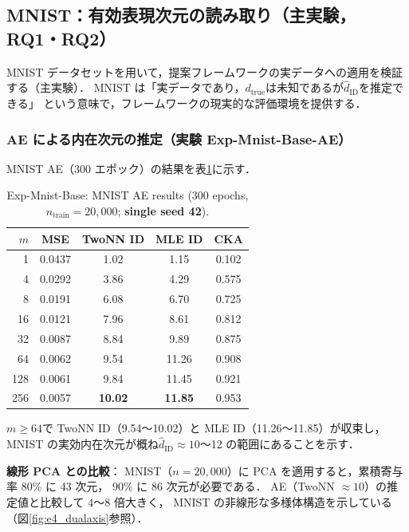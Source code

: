 \documentclass[11pt,a4paper]{jsarticle}
\newcommand{\dtrue}{d_{\mathrm{true}}}
\begin{document}
\subsection{MNIST：有効表現次元の読み取り（主実験，RQ1・RQ2）}\label{sec:exp_mnist}

MNIST データセットを用いて，提案フレームワークの実データへの適用を検証する（主実験）．
MNIST は「実データであり，$\dtrue$は未知であるが$\hat{d}_\mathrm{ID}$を推定できる」
という意味で，フレームワークの現実的な評価環境を提供する．

\subsubsection{AE による内在次元の推定（実験 Exp-Mnist-Base-AE）}

MNIST AE（300 エポック）の結果を表\ref{tab:e4_ae}に示す．

\begin{table}[H]
\centering
\caption{Exp-Mnist-Base: MNIST AE results (300 epochs, $n_\mathrm{train}=20{,}000$; \textbf{single seed 42}).}
\label{tab:e4_ae}
\small
\begin{tabular}{rcccc}
\toprule
$m$ & MSE & TwoNN ID & MLE ID & CKA \\
\midrule
1   & 0.0437 & 1.02  & 1.15  & 0.102 \\
4   & 0.0292 & 3.86  & 4.29  & 0.575 \\
8   & 0.0191 & 6.08  & 6.70  & 0.725 \\
16  & 0.0121 & 7.96  & 8.61  & 0.812 \\
32  & 0.0087 & 8.84  & 9.89  & 0.875 \\
64  & 0.0062 & 9.54  & 11.26 & 0.908 \\
128 & 0.0061 & 9.84  & 11.45 & 0.921 \\
256 & 0.0057 & \textbf{10.02} & \textbf{11.85} & 0.953 \\
\bottomrule
\end{tabular}
\end{table}

$m \geq 64$で TwoNN ID（9.54〜10.02）と MLE ID（11.26〜11.85）が収束し，
MNIST の実効内在次元が概ね$\hat{d}_\mathrm{ID} \approx 10$〜12 の範囲にあることを示す．

\textbf{線形 PCA との比較}：
MNIST（$n = 20{,}000$）に PCA を適用すると，累積寄与率 80\% に 43 次元，
90\% に 86 次元が必要である．
AE（TwoNN $\approx 10$）の推定値と比較して 4〜8 倍大きく，
MNIST の非線形な多様体構造を示している（図\ref{fig:e4_dualaxis}参照）．
\end{document}

